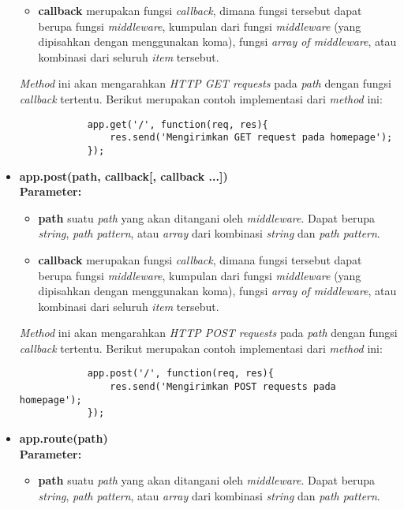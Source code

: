 \begin{itemize}
\begin{itemize}
			\item \textbf{callback} merupakan fungsi \textit{callback}, dimana fungsi tersebut dapat berupa fungsi \textit{middleware}, kumpulan dari fungsi \textit{middleware} (yang dipisahkan dengan menggunakan koma), fungsi \textit{array of middleware}, atau kombinasi dari seluruh \textit{item} tersebut.
		\end{itemize}
		
		\textit{Method} ini akan mengarahkan \textit{HTTP GET requests} pada \textit{path} dengan fungsi \textit{callback} tertentu. Berikut merupakan contoh implementasi dari \textit{method} ini:
		\begin{lstlisting}
			app.get('/', function(req, res){
				res.send('Mengirimkan GET request pada homepage');
			});
		\end{lstlisting}
		
	\item \textbf{app.post(path, callback[, callback ...])} \\ \textbf{Parameter:}
		\begin{itemize}
			\item \textbf{path} suatu \textit{path} yang akan ditangani oleh \textit{middleware}. Dapat berupa \textit{string}, \textit{path pattern}, atau \textit{array} dari kombinasi \textit{string} dan \textit{path pattern}.
			
			\item \textbf{callback} merupakan fungsi \textit{callback}, dimana fungsi tersebut dapat berupa fungsi \textit{middleware}, kumpulan dari fungsi \textit{middleware} (yang dipisahkan dengan menggunakan koma), fungsi \textit{array of middleware}, atau kombinasi dari seluruh \textit{item} tersebut.
		\end{itemize}
	
		\textit{Method} ini akan mengarahkan \textit{HTTP POST requests} pada \textit{path} dengan fungsi \textit{callback} tertentu. Berikut merupakan contoh implementasi dari \textit{method} ini:
		\begin{lstlisting}
			app.post('/', function(req, res){
				res.send('Mengirimkan POST requests pada homepage');
			});
		\end{lstlisting}
		
	\item \textbf{app.route(path)} \\ \textbf{Parameter:}
		\begin{itemize}
			\item \textbf{path} suatu \textit{path} yang akan ditangani oleh \textit{middleware}. Dapat berupa \textit{string}, \textit{path pattern}, atau \textit{array} dari kombinasi \textit{string} dan \textit{path pattern}.
		\end{itemize}
		

\end{itemize}
